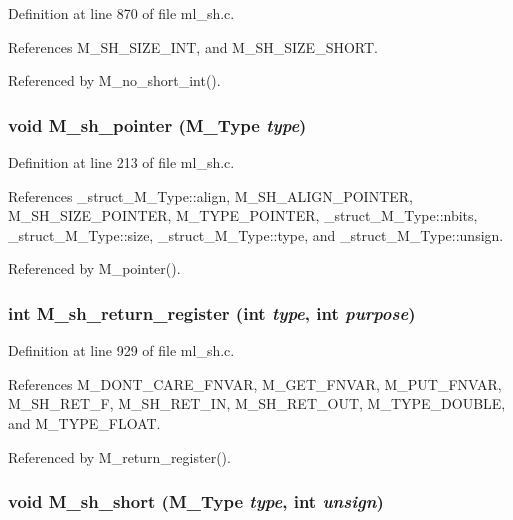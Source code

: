 Definition at line 870 of file ml\_\-sh.c.

References M\_\-SH\_\-SIZE\_\-INT, and M\_\-SH\_\-SIZE\_\-SHORT.

Referenced by M\_\-no\_\-short\_\-int().
\subsubsection{\setlength{\rightskip}{0pt plus 5cm}void M\_\-sh\_\-pointer (\bf{M\_\-Type} {\em type})}\label{m__sh_8h_f379a676b1a2d9b6acb4e3ab2280d743}




Definition at line 213 of file ml\_\-sh.c.

References \_\-struct\_\-M\_\-Type::align, M\_\-SH\_\-ALIGN\_\-POINTER, M\_\-SH\_\-SIZE\_\-POINTER, M\_\-TYPE\_\-POINTER, \_\-struct\_\-M\_\-Type::nbits, \_\-struct\_\-M\_\-Type::size, \_\-struct\_\-M\_\-Type::type, and \_\-struct\_\-M\_\-Type::unsign.

Referenced by M\_\-pointer().
\subsubsection{\setlength{\rightskip}{0pt plus 5cm}int M\_\-sh\_\-return\_\-register (int {\em type}, int {\em purpose})}\label{m__sh_8h_e7f7b08c2a13de2ec22822c1ea1c2bf0}




Definition at line 929 of file ml\_\-sh.c.

References M\_\-DONT\_\-CARE\_\-FNVAR, M\_\-GET\_\-FNVAR, M\_\-PUT\_\-FNVAR, M\_\-SH\_\-RET\_\-F, M\_\-SH\_\-RET\_\-IN, M\_\-SH\_\-RET\_\-OUT, M\_\-TYPE\_\-DOUBLE, and M\_\-TYPE\_\-FLOAT.

Referenced by M\_\-return\_\-register().
\subsubsection{\setlength{\rightskip}{0pt plus 5cm}void M\_\-sh\_\-short (\bf{M\_\-Type} {\em type}, int {\em unsign})}\label{m__sh_8h_9a55fa64720962195847c116f4c7143d}





